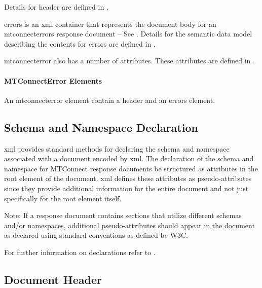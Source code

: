 Details for \gls{header} are defined in .  

\gls{errors} is an \gls{xml} container that represents the \gls{document body} for an \gls{mtconnecterrors response document} -- See .  Details for the \gls{semantic data model} describing the contents for \gls{errors} are defined in .

\gls{mtconnecterror} also has a number of attributes.  These attributes are defined in .

\paragraph{MTConnectError Elements}\mbox{}

An \gls{mtconnecterror} element \MUST contain a \gls{header} and an \gls{errors} element.



\subsection{Schema and Namespace Declaration}
\label{sec:Schema and Namespace Declaration}

\gls{xml} provides standard methods for declaring the \gls{schema} and \gls{namespace} associated with a document encoded by \gls{xml}.  The declaration of the \gls{schema} and \gls{namespace} for MTConnect \glspl{response document} \MUST be structured as attributes in the \gls{root element} of the document.  \gls{xml} defines these attributes as pseudo-attributes since they provide additional information for the entire document and not just specifically for the \gls{root element} itself.  

\begin{note}
Note:	If a \gls{response document} contains sections that utilize different \glspl{schema} and/or \glspl{namespace}, additional pseudo-attributes should appear in the document as declared using standard conventions as defined be W3C.

\end{note}

For further information on declarations refer to .

\subsection{Document Header}
\label{sec:Document Header}

